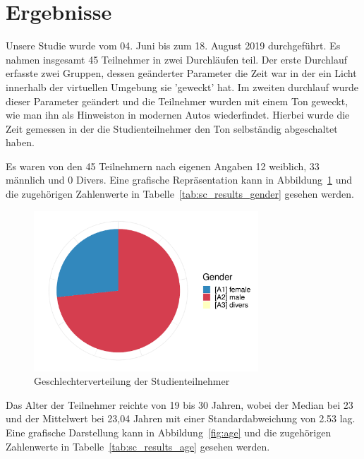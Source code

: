 \section{Ergebnisse}


Unsere Studie wurde vom 04. Juni bis zum 18. August 2019 durchgeführt. Es nahmen insgesamt 45 Teilnehmer in zwei Durchläufen teil. Der erste Durchlauf erfasste zwei Gruppen, dessen geänderter Parameter die Zeit war in der ein Licht innerhalb der virtuellen Umgebung sie 'geweckt' hat. Im zweiten durchlauf wurde dieser Parameter geändert und die Teilnehmer wurden mit einem Ton geweckt, wie man ihn als Hinweiston in modernen Autos wiederfindet. Hierbei wurde die Zeit gemessen in der die Studienteilnehmer den Ton selbständig abgeschaltet haben. 

Es waren von den 45 Teilnehmern nach eigenen Angaben 12 weiblich, 33 männlich und 0 Divers. Eine grafische Repräsentation kann in Abbildung~\ref{fig:gender} und die zugehörigen Zahlenwerte in Tabelle~\ref{tab:sc_results_gender} gesehen werden. 

\begin{figure}
	\centering
	\includegraphics[width=0.75\textwidth]{./appendices/gender}
	\caption{Geschlechterverteilung der Studienteilnehmer}
	\label{fig:gender}
\end{figure}

Das Alter der Teilnehmer reichte von 19 bis 30 Jahren, wobei der Median bei 23 und der Mittelwert bei 23,04 Jahren mit einer Standardabweichung von 2.53 lag. Eine grafische Darstellung kann in Abbildung~\ref{fig:age} und die zugehörigen Zahlenwerte in Tabelle~\ref{tab:sc_results_age} gesehen werden.

